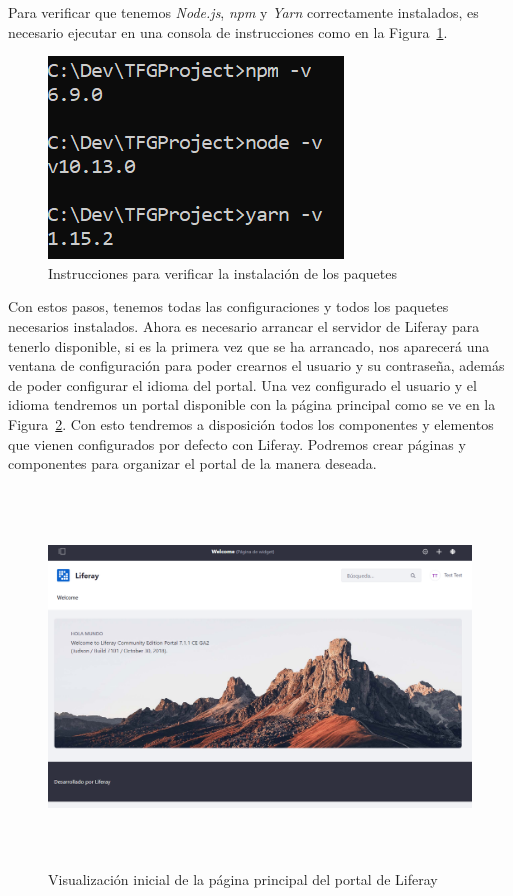 \documentclass[a4paper, 12pt]{book}
\begin{document}
\vspace{5mm}
Para verificar que tenemos \textit{Node.js}, \textit{npm} y \textit{Yarn} correctamente instalados, es necesario ejecutar en una consola de instrucciones como en la Figura~\ref{fig:verificacion}.
\begin{figure}
  \centering
  \includegraphics{img_usadas/verificacion.png}
  \caption{Instrucciones para verificar la instalación de los paquetes}
  \label{fig:verificacion}
\end{figure}

\vspace{20mm}
Con estos pasos, tenemos todas las configuraciones y todos los paquetes necesarios instalados. Ahora es necesario arrancar el servidor de Liferay para tenerlo disponible, si es la primera vez que se ha arrancado, nos aparecerá una ventana de configuración para poder crearnos el usuario y su contraseña, además de poder configurar el idioma del portal. Una vez configurado el usuario y el idioma tendremos un portal disponible con la página principal como se ve en la Figura~\ref{fig:liferay_ini}. Con esto tendremos a disposición todos los componentes y elementos que vienen configurados por defecto con Liferay. Podremos crear páginas y componentes para organizar el portal de la manera deseada.
\begin{figure}[h]
  \centering
  \includegraphics[width=15cm, height=10cm]{img_usadas/liferay_ini.png}
  \caption{Visualización inicial de la página principal del portal de Liferay}
  \label{fig:liferay_ini}
\end{figure}
\end{document}
